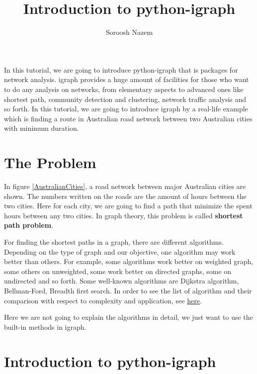 \documentclass[11pt]{article}
\title{Introduction to python-igraph}
\begin{document}
    \author{Soroosh Nazem}
    
    \maketitle
    
    In this tutorial, we are going to introduce python-igraph that is packages for network analysis. igraph provides a huge amount of facilities for those who want to do any analysis on networks, from elementary aspects to advanced ones like shortest path, community detection and clustering, network traffic analysis and so forth. In this tutorial, we are going to introduce igraph by a real-life example which is finding a route in Australian road network between two Australian cities with minimum duration.   
    
\tableofcontents

\section{The Problem}\label{the-problem}

In figure \ref{AustralianCities}, a road network between major Australian cities are shown. The numbers written on the roads are the amount of hours between the two cities. Here for each city, we are going to find a path that minimize the spent hours between any two cities. In graph theory, this problem is called \textbf{shortest path problem}. 

For finding the shortest paths in a graph, there are different algorithms. Depending on the type of graph and our objective, one algorithm may work better than others. For example, some algorithms work better on weighted graph, some others on unweighted, some work better on directed graphs, some on undirected and so forth. Some well-known algorithms are Dijkstra algorithm, Bellman-Ford, Breadth first search. In order to see the list of algorithm and their comparison with respect to complexity and application, see
\href{https://en.wikipedia.org/wiki/Shortest_path_problem#Algorithms}{here}.  

Here we are not going to explain the algorithms in detail, we just want to use the built-in methods in igraph.


    
\section{Introduction to
python-igraph}\label{introduction-to-python-igraph}
\end{document}

